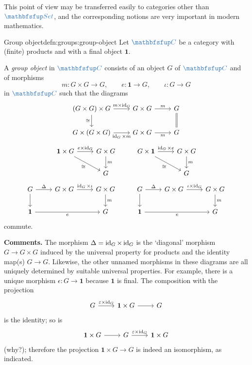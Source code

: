 This point of view may be transferred easily to categories other than
$\categ{Set}$, and the corresponding notions are very important in
modern mathematics.

\begin{defn}{Group object}{defn:groups:group-object}
  Let $\categ{C}$ be a category with (finite) products and with a
  final object $\mathbf{1}$.

  A \emph{group object} in $\categ{C}$ consists of an object $G$ of
  $\categ{C}$ and of morphisms
  \[
    m : G \times G \to G, \qquad e : \mathbf{1} \to G, \qquad \iota :
    G \to G
  \]
  in $\categ{C}$ such that the diagrams
  \[
    \begin{tikzcd}
      (G \times G) \times G \arrow[r, "m \times \id_G"]
      \arrow[d, "\cong"'] & G \times G \arrow[r, "m"] & G \arrow[d, equal] \\
      G \times (G \times G) \arrow[r, "\id_G \times m"'] & G \times G
      \arrow[r, "m"'] & G
    \end{tikzcd}
  \]
  \[
    \begin{tikzcd}
      \mathbf{1} \times G \arrow[r, "e \times \id_G"] \arrow[dr,
      "\cong"'] & G \times G \arrow[d, "m"] & G \times \mathbf{1}
      \arrow[r, "\id_G \times e"]
      \arrow[dr, "\cong"'] & G \times G \arrow[d, "m"] \\
      & G & & G
    \end{tikzcd}
  \]
  \[
    \begin{tikzcd}
      G \arrow[r, "\Delta"] \arrow[d] & G \times G \arrow[r, "\id_G
      \times \iota"] & G \times G \arrow[d, "m"] & G \arrow[r,
      "\Delta"] \arrow[d] & G \times G \arrow[r, "\iota \times \id_G"]
      & G \times G \arrow[d, "m"] \\
      \mathbf{1} \arrow[rr, "e"'] & & G & \mathbf{1} \arrow[rr, "e"']
      & & G
    \end{tikzcd}
  \]
  commute.
\end{defn}

\textbf{Comments.} The morphism $\Delta = \operatorname{id}_G \times \operatorname{id}_G$ is the
`diagonal' morphism $G \to G \times G$ induced by the universal
property for products and the identity map(s) $G \to G$. Likewise, the
other unnamed morphisms in these diagrams are all uniquely determined
by suitable universal properties. For example, there is a unique
morphism $\epsilon : G \to \mathbf{1}$ because $\mathbf{1}$ is
final. The composition with the projection
\[
  \begin{tikzcd}
    G \arrow[r, "\epsilon \times \id_G"] & \mathbf{1} \times G
    \arrow[r] & G
  \end{tikzcd}
\]
is the identity; so is
\[
  \begin{tikzcd}
    \mathbf{1} \times G \arrow[r] & G \arrow[r, "\epsilon \times
    \id_G"] & \mathbf{1} \times G
  \end{tikzcd}
\]
(why?); therefore the projection $\mathbf{1} \times G \to G$ is indeed
an isomorphism, as indicated.

